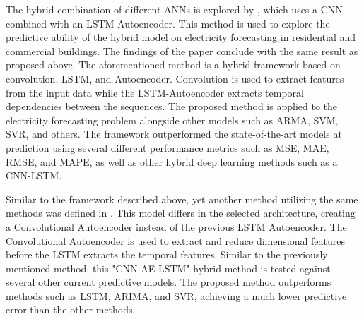 The hybrid combination of different ANNs is explored by \cite{Khan2020}, which uses a CNN combined with an LSTM-Autoencoder.
This method is used to explore the predictive ability of the hybrid model on electricity forecasting in residential and commercial buildings.
The findings of the paper conclude with the same result as proposed above.
The aforementioned method is a hybrid framework based on convolution, LSTM, and Autoencoder.
Convolution is used to extract features from the input data while the LSTM-Autoencoder extracts temporal dependencies between the sequences.
The proposed method is applied to the electricity forecasting problem alongside other models such as ARMA, SVM, SVR, and others.
The framework outperformed the state-of-the-art models at prediction using several different performance metrics such as MSE, MAE, RMSE, and MAPE,
as well as other hybrid deep learning methods such as a CNN-LSTM.


Similar to the framework described above, yet another method utilizing the same methods was defined in \cite{Zhao2019}.
This model differs in the selected architecture, creating a Convolutional Autoencoder instead of the previous LSTM Autoencoder.
The Convolutional Autoencoder is used to extract and reduce dimensional features before the LSTM extracts the temporal features.
Similar to the previously mentioned method, this "CNN-AE LSTM" hybrid method is tested against several other current predictive models.
The proposed method outperforms methods such as LSTM, ARIMA, and SVR, achieving a much lower predictive error than the other methods.



